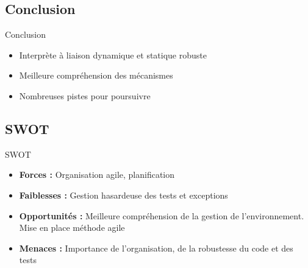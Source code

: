 \documentclass[info]{ensrennesbeamer}
\begin{document}
\subsection{Conclusion}
\begin{frame}
	\begin{block}{Conclusion}
		\begin{itemize}
		\item Interprète à liaison dynamique et statique robuste
		\item Meilleure compréhension des mécanismes
		\item Nombreuses pistes pour poursuivre
		\end{itemize}
	\end{block}
\end{frame}

\subsection{SWOT}
\begin{frame}
	\begin{block}{SWOT}
		\begin{itemize}
			\item \textbf{Forces :} Organisation agile, planification
			\item \textbf{Faiblesses :} Gestion hasardeuse des tests et exceptions
			\item \textbf{Opportunités :} Meilleure compréhension de la gestion de l'environnement. Mise en place méthode agile
			\item \textbf{Menaces :} Importance de l'organisation, de la robustesse du code et des tests
		\end{itemize}
	\end{block}
\end{frame}
\end{document}
